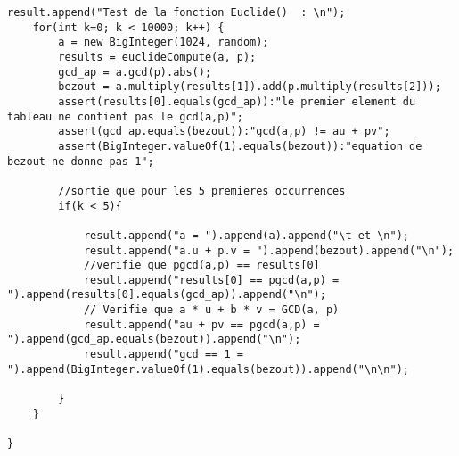 \documentclass[a4paper,11pt]{article}
\begin{document}
\begin{lstlisting}[caption ={testEuclide}, captionpos=b,breaklines = true]
    result.append("Test de la fonction Euclide()  : \n");
    for(int k=0; k < 10000; k++) {
        a = new BigInteger(1024, random);
        results = euclideCompute(a, p);
        gcd_ap = a.gcd(p).abs();
        bezout = a.multiply(results[1]).add(p.multiply(results[2]));
        assert(results[0].equals(gcd_ap)):"le premier element du tableau ne contient pas le gcd(a,p)";
        assert(gcd_ap.equals(bezout)):"gcd(a,p) != au + pv";
        assert(BigInteger.valueOf(1).equals(bezout)):"equation de bezout ne donne pas 1";

        //sortie que pour les 5 premieres occurrences
        if(k < 5){

            result.append("a = ").append(a).append("\t et \n");
            result.append("a.u + p.v = ").append(bezout).append("\n");
            //verifie que pgcd(a,p) == results[0]
            result.append("results[0] == pgcd(a,p) = ").append(results[0].equals(gcd_ap)).append("\n");
            // Verifie que a * u + b * v = GCD(a, p)
            result.append("au + pv == pgcd(a,p) = ").append(gcd_ap.equals(bezout)).append("\n");
            result.append("gcd == 1 = ").append(BigInteger.valueOf(1).equals(bezout)).append("\n\n");

        }
    }

}\end{lstlisting}
\end{document}
